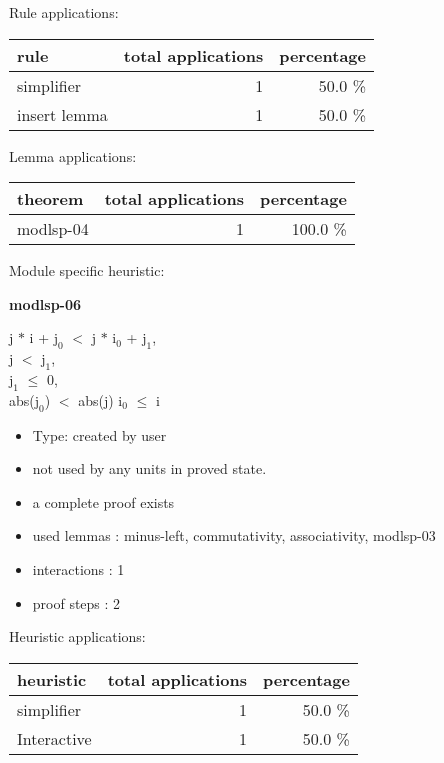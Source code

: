 \documentclass[a4paper]{article}
\begin{document}
Rule applications:

\begin{supertabular}{l|r|r}
rule	        & total applications & percentage \\ \hline
simplifier & 1 & 50.0 \% \\
insert lemma & 1 & 50.0 \% \\

\end{supertabular}

Lemma applications:

\begin{supertabular}{l|r|r}
theorem	        & total applications & percentage \\ \hline
modlsp-04 & 1 & 100.0 \% \\

\end{supertabular}

Module specific heuristic:

\pagebreak

{\LARGE\bf modlsp-06}\label{lemma-modlsp-06}

\medskip

j $*$ i + $\mbox{j}_{0}$ $<$ j $*$ $\mbox{i}_{0}$ + $\mbox{j}_{1}$, \\
j $<$ $\mbox{j}_{1}$, \\
$\mbox{j}_{1}$ $\le$ 0, \\
abs($\mbox{j}_{0}$) $<$ abs(j) \Fol $\mbox{i}_{0}$ $\le$ i

\begin{itemize}

\item Type: created by user

\item not used by any units in proved state.
\item       a complete proof exists
\item       used lemmas  : minus-left, commutativity, associativity, modlsp-03
\item       interactions : 1
\item       proof steps  : 2
\end{itemize}

\medskip


Heuristic applications:

\begin{supertabular}{l|r|r}
heuristic	& total applications & percentage \\ \hline
simplifier & 1 & 50.0 \% \\
Interactive & 1 & 50.0 \% \\

\end{supertabular}
\end{document}

